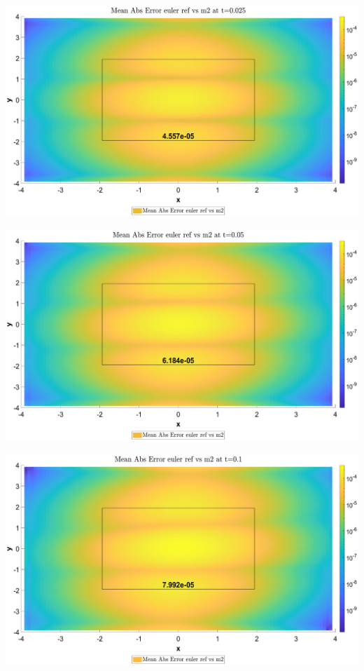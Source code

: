 \begin{landscape}
\includegraphics[width=.95\columnwidth]{CDF/CDFEulerRef_4}
\end{landscape}
\begin{landscape}
\includegraphics[width=.95\columnwidth]{CDF/CDFEulerRef_5}
\end{landscape}
\begin{landscape}
\includegraphics[width=.95\columnwidth]{CDF/CDFEulerRef_6}
\end{landscape}
